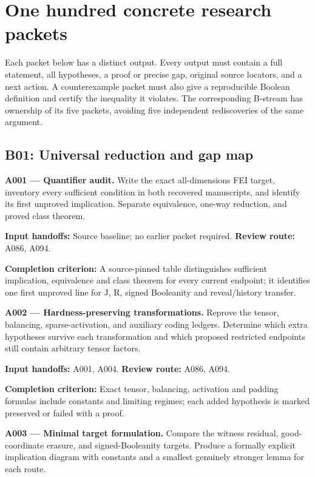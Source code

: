 \documentclass[11pt]{article}
\begin{document}
\endgroup

\section{One hundred concrete research packets}

Each packet below has a distinct output. Every output must contain a full statement, all hypotheses, a proof or precise gap, original source locators, and a next action. A counterexample packet must also give a reproducible Boolean definition and certify the inequality it violates. The corresponding B-stream has ownership of its five packets, avoiding five independent rediscoveries of the same argument.
\subsection{B01: Universal reduction and gap map}

\textbf{A001 --- Quantifier audit.} Write the exact all-dimensions FEI target, inventory every sufficient condition in both recovered manuscripts, and identify its first unproved implication. Separate equivalence, one-way reduction, and proved class theorem.

{\small\color{ink}\textbf{Input handoffs:} Source baseline; no earlier packet required. \textbf{Review route:} A086, A094.\par
\textbf{Completion criterion:} A source-pinned table distinguishes sufficient implication, equivalence and class theorem for every current endpoint; it identifies one first unproved line for J, R, signed Booleanity and reveal/history transfer.\par}



\textbf{A002 --- Hardness-preserving transformations.} Reprove the tensor, balancing, sparse-activation, and auxiliary coding ledgers. Determine which extra hypotheses survive each transformation and which proposed restricted endpoints still contain arbitrary tensor factors.

{\small\color{ink}\textbf{Input handoffs:} A001, A004. \textbf{Review route:} A086, A094.\par
\textbf{Completion criterion:} Exact tensor, balancing, activation and padding formulas include constants and limiting regimes; each added hypothesis is marked preserved or failed with a proof.\par}



\textbf{A003 --- Minimal target formulation.} Compare the witness residual, good-coordinate erasure, and signed-Booleanity targets. Produce a formally explicit implication diagram with constants and a smallest genuinely stronger lemma for each route.
\end{document}
